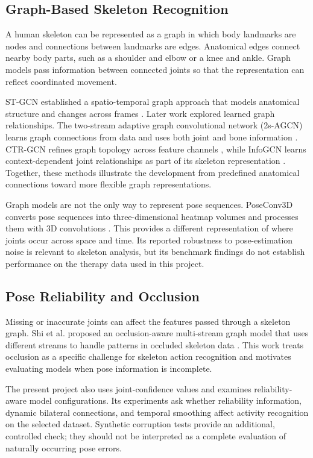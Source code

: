 \subsection{Graph-Based Skeleton Recognition}

A human skeleton can be represented as a graph in which body landmarks are nodes and connections between landmarks are edges. Anatomical edges connect nearby body parts, such as a shoulder and elbow or a knee and ankle. Graph models pass information between connected joints so that the representation can reflect coordinated movement.

ST-GCN established a spatio-temporal graph approach that models anatomical structure and changes across frames \cite{yan2018stgcn}. Later work explored learned graph relationships. The two-stream adaptive graph convolutional network (2s-AGCN) learns graph connections from data and uses both joint and bone information \cite{Shi2019}. CTR-GCN refines graph topology across feature channels \cite{Chen2021}, while InfoGCN learns context-dependent joint relationships as part of its skeleton representation \cite{Chi2022InfoGCN}. Together, these methods illustrate the development from predefined anatomical connections toward more flexible graph representations.

Graph models are not the only way to represent pose sequences. PoseConv3D converts pose sequences into three-dimensional heatmap volumes and processes them with 3D convolutions \cite{Duan2022PoseConv3D}. This provides a different representation of where joints occur across space and time. Its reported robustness to pose-estimation noise is relevant to skeleton analysis, but its benchmark findings do not establish performance on the therapy data used in this project.

\subsection{Pose Reliability and Occlusion}

Missing or inaccurate joints can affect the features passed through a skeleton graph. Shi et al. proposed an occlusion-aware multi-stream graph model that uses different streams to handle patterns in occluded skeleton data \cite{Shi2023Occlusion}. This work treats occlusion as a specific challenge for skeleton action recognition and motivates evaluating models when pose information is incomplete.

The present project also uses joint-confidence values and examines reliability-aware model configurations. Its experiments ask whether reliability information, dynamic bilateral connections, and temporal smoothing affect activity recognition on the selected dataset. Synthetic corruption tests provide an additional, controlled check; they should not be interpreted as a complete evaluation of naturally occurring pose errors.

